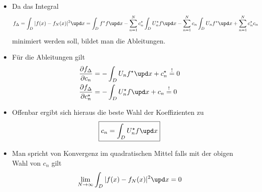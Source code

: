     \begin{frame}
          \begin{itemize}[<+->]
          \item Da das Integral 
                  $$
      f_\Delta =\int_D |f(x) - f_N(x)|^2 \upd x = \int_D f^\star f \upd x -\sum_{n=1}^N c_n^\star \int_D U_n^\star f \upd x -\sum_{n=1}^N c_n \int_D U_n f^\star \upd x + \sum_{n=1}^N c_n^\star c_n
      $$
      minimiert werden soll, bildet man die Ableitungen.
    \item Für die Ableitungen gilt
      \begin{align*}
        \frac{\partial f_\Delta}{\partial c_n} &= - \int_D U_n f^\star \upd x + c_n^\star \stackrel{!}{=} 0\\
        \frac{\partial f_\Delta}{\partial c_n^\star} &= - \int_D U_n^\star f \upd x + c_n \stackrel{!}{=} 0
      \end{align*}
    \item Offenbar ergibt sich hieraus die beste Wahl der Koeffizienten zu
      $$
      \boxed{c_n = \int_D U_n^\star f \upd x}
      $$
    \item Man spricht von \alert{Konvergenz im quadratischen Mittel} falls mit der obigen Wahl von $c_n$ gilt
      $$
   \lim_{N\to\infty} \int_D |f(x) - f_N(x)|^2 \upd x = 0   
      $$
            \end{itemize}
      \end{frame}


